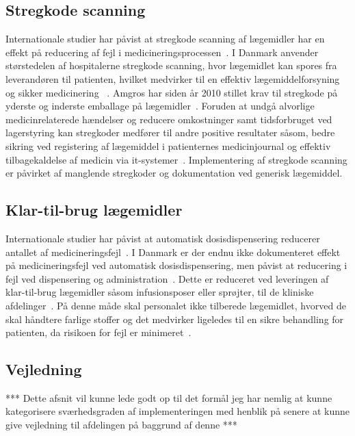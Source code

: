 \subsection{Stregkode scanning}
Internationale studier har påvist at stregkode scanning af lægemidler har en effekt på reducering af fejl i medicineringsprocessen~\citep{Poon2006,Bates2000,Levtzion-korach2010}. I Danmark anvender størstedelen af hospitalerne stregkode scanning, hvor lægemidlet kan spores fra leverandøren til patienten, hvilket medvirker til en effektiv lægemiddelforsyning og sikker medicinering ~\citep{Dzik2007,DPSD2008,Amgros2013}. Amgros har siden år 2010 stillet krav til stregkode på yderste og inderste emballage på lægemidler~\citep{Amgros2013}. Foruden at undgå alvorlige medicinrelaterede hændelser og reducere omkostninger samt tidsforbruget ved lagerstyring kan stregkoder medfører til andre positive resultater såsom, bedre sikring ved registering af lægemiddel i patienternes medicinjournal og effektiv tilbagekaldelse af medicin via it-systemer~\citep{Amgros2013}.
Implementering af stregkode scanning er påvirket af manglende stregkoder og dokumentation ved generisk lægemiddel. 

\subsection{Klar-til-brug lægemidler}
Internationale studier har påvist at automatisk dosisdispensering reducerer antallet af medicineringsfejl~\citep{Oren2003,Sygehusapotekerne2012}. I Danmark er der endnu ikke dokumenteret effekt på medicineringsfejl ved automatisk dosisdispensering, men påvist at reducering i fejl ved dispensering og administration~\citep{Sygehusapotekerne2012}. Dette er reduceret ved leveringen af klar-til-brug lægemidler såsom infusionsposer eller sprøjter, til de kliniske afdelinger~\citep{Sygehusapotekerne2012}. På denne måde skal personalet ikke tilberede lægemidlet, hvorved de skal håndtere farlige stoffer og det medvirker ligeledes til en sikre behandling for patienten, da risikoen for fejl er minimeret~\citep{Amgros2013}. 

\subsection{Vejledning}
*** Dette afsnit vil kunne lede godt op til det formål jeg har nemlig at kunne kategorisere sværhedsgraden af implementeringen med henblik på senere at kunne give vejledning til afdelingen på baggrund af denne ***